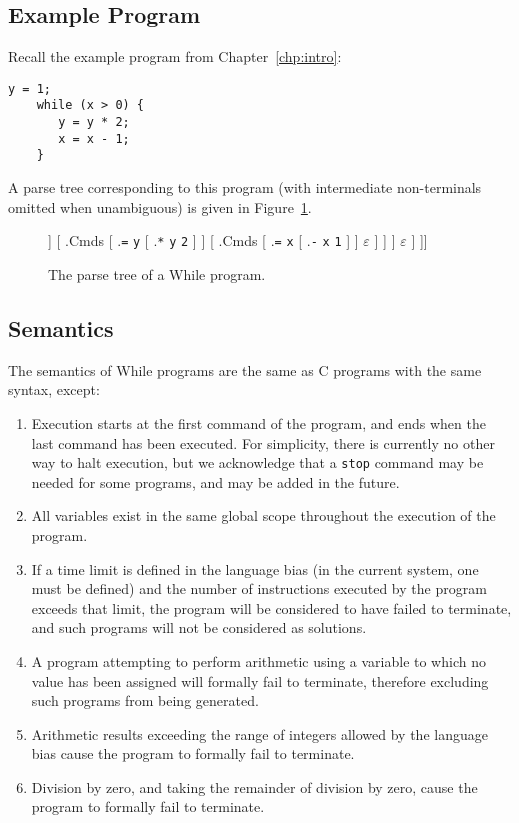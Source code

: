 \documentclass[a4paper,twoside,notitlepage]{report}
\newcommand{\ttt}{\texttt}
\begin{document}
\subsection{Example Program}

Recall the example program from Chapter~\ref{chp:intro}:
\begin{Verbatim}[samepage=true]
    y = 1;
    while (x > 0) {
       y = y * 2;
       x = x - 1;
    }
\end{Verbatim}

A parse tree corresponding to this program (with intermediate non-terminals 
omitted when unambiguous) is given in Figure~\ref{fig:parsetree}.

\begin{figure}[h]
  \caption{The parse tree of a While program.}
  \label{fig:parsetree}
  \Tree[ .Prog [ .Cmds
    [ .\ttt{=} \ttt{y} \ttt{1} ]
    [ .Cmds
      [ .\ttt{while}
        [ .Bool [ .\ttt{>} \ttt{x} \ttt{0} ] ]
        [ .Cmds
          [ .\ttt{=} \ttt{y} [ .\ttt{*} \ttt{y} \ttt{2} ] ]
          [ .Cmds
            [ .\ttt{=} \ttt{x} [ .\ttt{-} \ttt{x} \ttt{1} ] ]
            $\varepsilon$
          ]
        ]
      ]
      $\varepsilon$
    ]
  ]]
\end{figure}

\subsection{Semantics}
The semantics of While programs are the same as C programs with the same 
syntax, except:
\begin{enumerate}
    \item Execution starts at the first command of the program, and ends when 
    the last command has been executed. For simplicity, there is currently no 
    other way to halt execution, but we acknowledge that a \ttt{stop} command 
    may be needed for some programs, and may be added in the future.
    \item All variables exist in the same global scope throughout the 
    execution of the program.
    \item If a time limit is defined in the language bias (in the current 
    system, one must be defined) and the number of instructions executed by 
    the program exceeds that limit, the program will be considered to have 
    failed to terminate, and such programs will not be considered as 
solutions.
    \item A program attempting to perform arithmetic using a variable to which
    no value has been assigned will formally fail to terminate, therefore 
    excluding such programs from being generated.
    \item Arithmetic results exceeding the range of integers allowed by the 
    language bias cause the program to formally fail to terminate.
    \item Division by zero, and taking the remainder of division by zero,
    cause the program to formally fail to terminate.
\end{enumerate}
\end{document}
